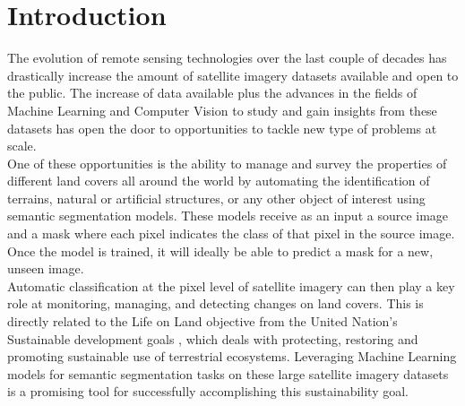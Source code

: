 \documentclass[conference]{IEEEtran}
\begin{document}
\section{Introduction}
The evolution of remote sensing technologies over the last couple of decades has drastically increase the amount of satellite imagery datasets available and open to the public. The increase of data available plus the advances in the fields of Machine Learning and Computer Vision to study and gain insights from these datasets has open the door to opportunities to tackle new type of problems at scale. \\ \indent
One of these opportunities is the ability to manage and survey the properties of different land covers all around the world by automating the identification of terrains, natural or artificial structures, or any other object of interest using semantic segmentation models. These models receive as an input a source image and a mask where each pixel indicates the class of that pixel in the source image. Once the model is trained, it will ideally be able to predict a mask for a new, unseen image.  \\ \indent
Automatic classification at the pixel level of satellite imagery can then play a key role at monitoring, managing, and detecting changes on land covers. This is directly related to the Life on Land objective from the United Nation's Sustainable development goals  \cite{united_nations}, which deals with protecting, restoring and promoting sustainable use of terrestrial ecosystems. Leveraging Machine Learning models for semantic segmentation tasks on these large satellite imagery datasets is a promising tool for successfully accomplishing this sustainability goal.

\end{document}
